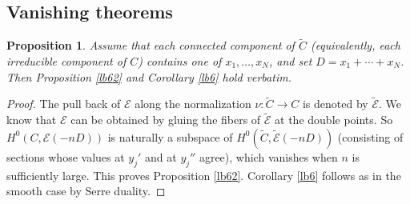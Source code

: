 \documentclass[12pt,a4paper,notitlepage]{report}
\theoremstyle{definition}
\theoremstyle{plain}
\newtheorem{pp}[df]{Proposition}
\newcommand{\wtd}{\widetilde}
\newcommand{\scr}{\mathscr}
\numberwithin{equation}{section}
\begin{document}
\subsection*{Vanishing theorems}







\begin{pp}\label{lb121}
Assume that each connected component of $\wtd C$ (equivalently, each irreducible component of $C$) contains one of $x_1,\dots,x_N$, and set $D=x_1+\cdots+x_N$. Then Proposition \ref{lb62} and Corollary \ref{lb6} hold verbatim.
\end{pp}


\begin{proof}
The pull back of $\scr E$ along the normalization $\nu:\wtd C\rightarrow C$ is denoted by $\wtd{\scr E}$. We know that $\scr E$ can be obtained by gluing the fibers of $\wtd{\scr E}$ at the double points.  So $H^0(C,\scr E(-nD))$ is naturally a subspace of $H^0(\wtd C,\wtd{\scr E}(-nD))$ (consisting of sections whose values at $y_j'$ and at $y_j''$ agree), which vanishes when $n$ is sufficiently large. This proves Proposition \ref{lb62}. Corollary \ref{lb6} follows as in the smooth case by Serre duality.
\end{proof}
\end{document}
